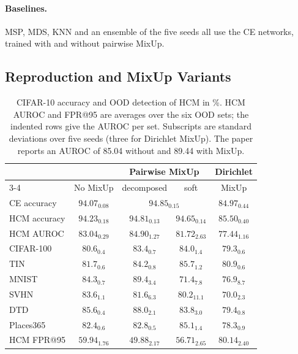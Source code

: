 \documentclass[letterpaper]{article} %
\begin{document}
\paragraph{Baselines.} MSP, MDS, KNN and an ensemble of the five seeds all use the CE networks, trained with and without pairwise MixUp.

\subsection{Reproduction and MixUp Variants}
\label{sec:cifar-repro}

\begin{table}[t]
  \centering
  \small
  \setlength{\tabcolsep}{1mm}
  \begin{tabular}{@{}lcccc@{}}
    \toprule
    & & \multicolumn{2}{c}{Pairwise MixUp} & Dirichlet \\
    \cmidrule(lr){3-4}
    & No MixUp & decomposed & soft & MixUp \\
    \midrule
    CE accuracy  & $94.07_{0.08}$ & \multicolumn{2}{c}{$94.85_{0.15}$} & $84.97_{0.44}$ \\
    HCM accuracy & $94.23_{0.18}$ & $94.81_{0.13}$ & $94.65_{0.14}$ & $85.50_{0.40}$ \\
    \midrule
    HCM AUROC &$83.04_{0.29}$ & $\mathbf{84.90}_{1.27}$ & $81.72_{2.63}$ & $77.44_{1.16}$ \\
    \quad CIFAR-100 & $80.6_{0.4}$ & $83.4_{0.7}$ & $84.0_{1.4}$ & $79.3_{0.6}$ \\
    \quad TIN       & $81.7_{0.6}$ & $84.2_{0.8}$ & $85.7_{1.2}$ & $80.9_{0.6}$ \\
    \quad MNIST     & $84.3_{0.7}$ & $89.4_{3.4}$ & $71.4_{7.8}$ & $76.9_{8.7}$ \\
    \quad SVHN      & $83.6_{1.1}$ & $81.6_{6.3}$ & $80.2_{11.1}$ & $70.0_{2.3}$ \\
    \quad DTD       & $85.6_{0.4}$ & $88.0_{2.1}$ & $83.8_{3.0}$ & $79.4_{0.8}$ \\
    \quad Places365 & $82.4_{0.6}$ & $82.8_{0.5}$ & $85.1_{1.4}$ & $78.3_{0.9}$ \\
    \midrule
    HCM FPR@95 &$59.94_{1.76}$ & $49.88_{2.17}$ & $56.71_{2.65}$ & $80.14_{2.40}$ \\
    \bottomrule
  \end{tabular}
  \caption{CIFAR-10 accuracy and OOD detection of HCM in \%. HCM AUROC and FPR@95 are averages over the six OOD sets; the indented rows give the AUROC per set. Subscripts are standard deviations over five seeds (three for Dirichlet MixUp). The paper reports an AUROC of 85.04 without and 89.44 with MixUp.}
  \label{tab:hcm_overall}
\end{table}
\end{document}
